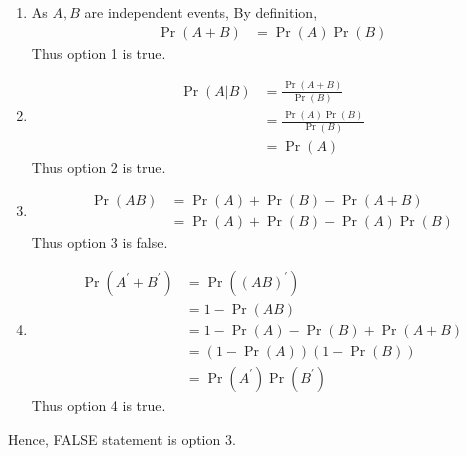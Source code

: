 \begin{enumerate}
    \item As $A,B$ are independent events, By definition,  
    \begin{align*}
        \Pr(A +B) &= \Pr(A)\Pr(B)
    \end{align*}
    Thus option 1 is true.
    \item 
    \begin{align*}
        \Pr(A|B) &= \frac{\Pr(A +B)}{\Pr(B)} \\
        &= \frac{\Pr(A)\Pr(B)}{\Pr(B)}\\
        &= \Pr(A)
    \end{align*}
    Thus option 2 is true.
    \item \begin{align*}
        \Pr(A B) &= \Pr(A) + \Pr(B) - \Pr(A +B) \\
        &= \Pr(A) + \Pr(B) - \Pr(A)\Pr(B)
    \end{align*}
    Thus option 3 is false. 
    \item \begin{align*}
        \Pr( A ^{\prime} + B ^{\prime}) &= \Pr(( A B )^{\prime} )\\
        &= 1- \Pr( A B)\\
        &= 1- \Pr(A) - \Pr(B) + \Pr(A +B) \\
        &= ( 1- \Pr(A) ) ( 1- \Pr(B) ) \\
        &= \Pr( A ^{\prime})\Pr( B ^{\prime})
    \end{align*}
    Thus option 4 is true.
\end{enumerate}
Hence, FALSE statement is option 3.